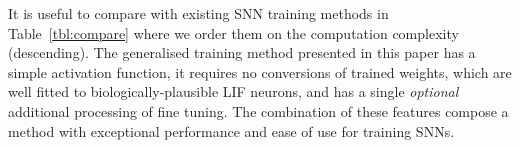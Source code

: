 \documentclass{article}
\begin{document}
	
	It is useful to compare with existing SNN training methods in Table~\ref{tbl:compare} where we order them on the computation complexity (descending).
	The generalised training method presented in this paper has a simple activation function, it requires no conversions of trained weights, which are well fitted to biologically-plausible LIF neurons, and has a single \emph{optional} additional processing of fine tuning.
	The combination of these features compose a method with exceptional performance and ease of use for training SNNs.
	
\end{document}
